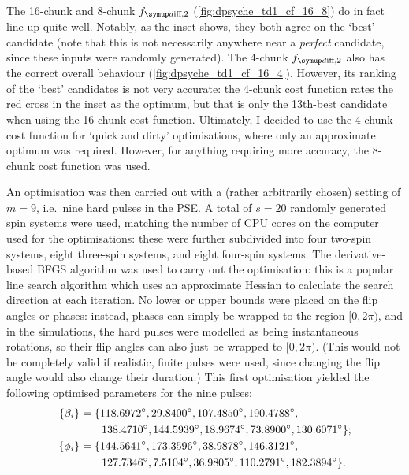 The 16-chunk and 8-chunk $\fdifftwo$ (\cref{fig:dpsyche_td1_cf_16_8}) do in fact line up quite well.
Notably, as the inset shows, they both agree on the `best' candidate (note that this is not necessarily anywhere near a \textit{perfect} candidate, since these inputs were randomly generated).
The 4-chunk $\fdifftwo$ also has the correct overall behaviour (\cref{fig:dpsyche_td1_cf_16_4}).
However, its ranking of the `best' candidates is not very accurate: the 4-chunk cost function rates the red cross in the inset as the optimum, but that is only the 13th-best candidate when using the 16-chunk cost function.
Ultimately, I decided to use the 4-chunk cost function for `quick and dirty' optimisations, where only an approximate optimum was required.
However, for anything requiring more accuracy, the 8-chunk cost function was used.

An optimisation was then carried out with a (rather arbitrarily chosen) setting of $m = 9$, i.e.\ nine hard pulses in the PSE.
A total of $s = 20$ randomly generated spin systems were used, matching the number of CPU cores on the computer used for the optimisations: these were further subdivided into four two-spin systems, eight three-spin systems, and eight four-spin systems.
The derivative-based BFGS algorithm was used to carry out the optimisation: this is a popular line search algorithm which uses an approximate Hessian to calculate the search direction at each iteration.\autocite{Kelley1999,Nocedal2006}
No lower or upper bounds were placed on the flip angles or phases: instead, phases can simply be wrapped to the region $[0, 2\pi)$, and in the simulations, the hard pulses were modelled as being instantaneous rotations, so their flip angles can also just be wrapped to $[0, 2\pi)$.
(This would not be completely valid if realistic, finite pulses were used, since changing the flip angle would also change their duration.)
This first optimisation yielded the following optimised parameters for the nine pulses:
\begin{align}
    \{\beta_i\} &= \{\ang{118.6972}, \ang{29.8400}, \ang{107.4850}, \ang{190.4788}, \notag \\
                &\qquad \ang{138.4710}, \ang{144.5939}, \ang{18.9674}, \ang{73.8900}, \ang{130.6071}\}; \label{eq:dpsyche_opt_nosens_angles} \\
     \{\phi_i\} &= \{\ang{144.5641}, \ang{173.3596}, \ang{38.9878}, \ang{146.3121}, \notag \\
                &\qquad \ang{127.7346}, \ang{7.5104}, \ang{36.9805}, \ang{110.2791}, \ang{182.3894}\}. \label{eq:dpsyche_opt_nosens_phases}
\end{align}

